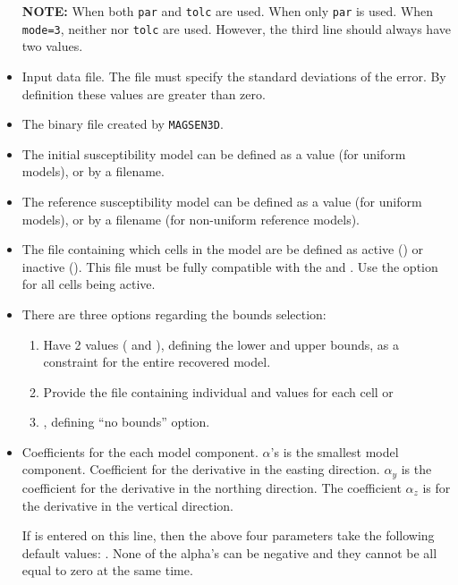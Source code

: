 \begin{itemize}
\textbf{NOTE:} When  both \texttt{par} and \texttt{tolc} are used. When  only \texttt{par} is used. When \texttt{mode=3}, neither  nor \texttt{tolc} are used. However, the third line should always have two values. \\
\item [\fileName{obs.mag}] Input data file. The file must specify the standard deviations of the error. By definition these values are greater than zero.
\item[\fileName{mag3d.mtx}] The binary file created by \texttt{MAGSEN3D}.
\item[\fileName{ini.sus}] The initial susceptibility model can be defined as a value (for uniform models), or by a filename.
\item[\fileName{ref.sus}] The reference susceptibility model can be defined as a value (for uniform models), or by a filename (for non-uniform reference models).
\item[\fileName{active.txt}] The file containing which cells in the model are be defined as active () or inactive (). This file must be fully compatible with the  and . Use the  option for all cells being active.
\item[\fileName{bounds.sus}] There are three options regarding the bounds selection:
\begin{enumerate}
\item Have 2 values ( and ), defining the lower and upper bounds, as a constraint for the entire recovered model.
\item Provide the file  containing individual  and  values for each cell or
\item {}, defining ``no bounds'' option.
\end{enumerate}

\item [\fileName{$\alpha_s, \alpha_x, \alpha_y, \alpha_z$}] Coefficients for the each model component. $\alpha$'s is the smallest model component. Coefficient for the derivative in the easting direction. $\alpha_y$ is the coefficient for the derivative in the northing direction. The coefficient $\alpha_z$ is for the derivative in the vertical direction.

If  is entered on this line, then the above four parameters take the following default values: . None of the alpha's can be negative and they cannot be all equal to zero at the same time.


\end{itemize}
